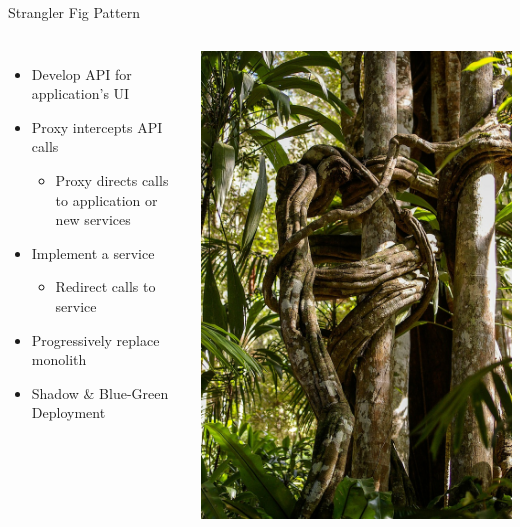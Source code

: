 \documentclass{slide}
\begin{document}
\begin{frame}{Strangler Fig Pattern}
    \vspace{1pt}
    \begin{columns}
      {\LARGE
        \begin{itemize}
            \item Develop API for application's UI
            \vspace{1mm}
            \item Proxy intercepts API calls
            \begin{itemize}
                \Large\item Proxy directs calls to application or new services
            \end{itemize}
            \vspace{1mm}
            \item Implement a service
            \begin{itemize}
                \Large\item Redirect calls to service
            \end{itemize}
            \item Progressively replace monolith
            \item Shadow \& Blue-Green Deployment
        \end{itemize}
      }
        \centering
        \includegraphics[height=0.9\textheight]{images/strangler-fig.jpg}

\end{columns}
\end{frame}
\end{document}
